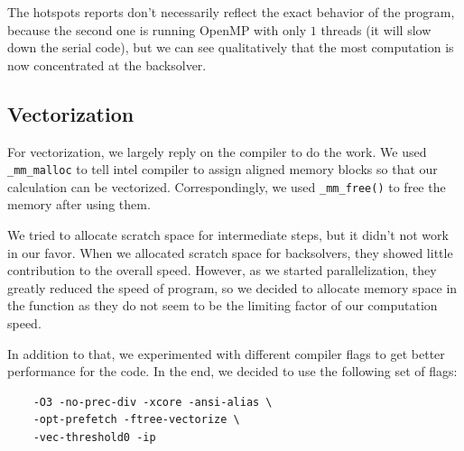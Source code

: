 \documentclass[a4paper,11pt]{article}
\begin{document}
\begin{multicols}{2}
The hotspots reports don't necessarily reflect the exact behavior of the program, because the second one is running OpenMP with only $1$ threads (it will slow down the serial code), but we can see qualitatively that the most computation is now concentrated at the backsolver.
	\subsection{Vectorization}
	For vectorization, we largely reply on the compiler to do the work. We used \verb|_mm_malloc| to tell intel compiler to assign aligned memory blocks so that our calculation can be vectorized. Correspondingly, we used \verb|_mm_free()| to free the memory after using them.
	\par We tried to allocate scratch space for intermediate steps, but it didn't not work in our favor. When we allocated scratch space for backsolvers, they showed little contribution to the overall speed. However, as we started parallelization, they greatly reduced the speed of program, so we decided to allocate memory space in the function as they do not seem to be the limiting factor of our computation speed.
	\par In addition to that, we experimented with different compiler flags to get better performance for the code. In the end, we decided to use the following set of flags:
	\begin{framed}
	\begin{center}
	\begin{verbatim}
	-O3 -no-prec-div -xcore -ansi-alias \
	-opt-prefetch -ftree-vectorize \
	-vec-threshold0 -ip
	\end{verbatim}
	\end{center}
	\end{framed}

\end{multicols}
\end{document}

